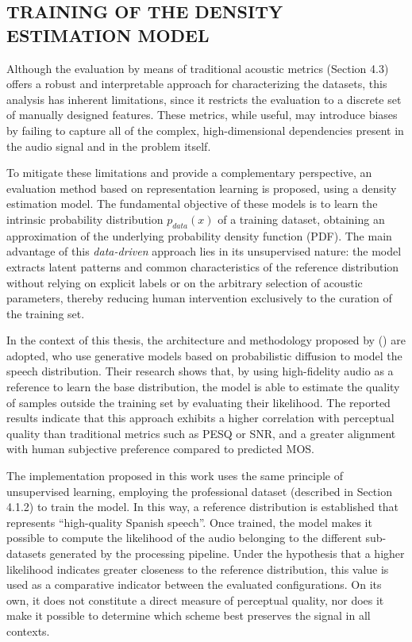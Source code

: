 \subsection{TRAINING OF THE DENSITY ESTIMATION MODEL}
Although the evaluation by means of traditional acoustic metrics (Section 4.3) offers a robust and interpretable approach for characterizing the datasets, this analysis has inherent limitations, since it restricts the evaluation to a discrete set of manually designed features. These metrics, while useful, may introduce biases by failing to capture all of the complex, high-dimensional dependencies present in the audio signal and in the problem itself.

To mitigate these limitations and provide a complementary perspective, an evaluation method based on representation learning is proposed, using a density estimation model. The fundamental objective of these models is to learn the intrinsic probability distribution $p_{data}(x)$ of a training dataset, obtaining an approximation of the underlying probability density function (PDF). The main advantage of this \textit{data-driven} approach lies in its unsupervised nature: the model extracts latent patterns and common characteristics of the reference distribution without relying on explicit labels or on the arbitrary selection of acoustic parameters, thereby reducing human intervention exclusively to the curation of the training set.

In the context of this thesis, the architecture and methodology proposed by (\cite{danilo2025_quality}) are adopted, who use generative models based on probabilistic diffusion to model the speech distribution. Their research shows that, by using high-fidelity audio as a reference to learn the base distribution, the model is able to estimate the quality of samples outside the training set by evaluating their likelihood. The reported results indicate that this approach exhibits a higher correlation with perceptual quality than traditional metrics such as PESQ or SNR, and a greater alignment with human subjective preference compared to predicted MOS.

The implementation proposed in this work uses the same principle of unsupervised learning, employing the professional dataset (described in Section 4.1.2) to train the model. In this way, a reference distribution is established that represents ``high-quality Spanish speech''. Once trained, the model makes it possible to compute the likelihood of the audio belonging to the different sub-datasets generated by the processing pipeline. Under the hypothesis that a higher likelihood indicates greater closeness to the reference distribution, this value is used as a comparative indicator between the evaluated configurations. On its own, it does not constitute a direct measure of perceptual quality, nor does it make it possible to determine which scheme best preserves the signal in all contexts.

